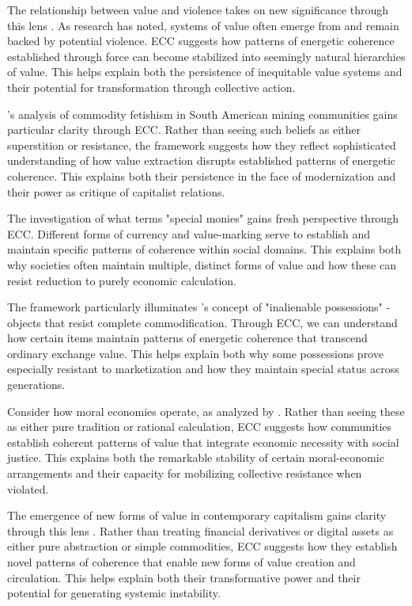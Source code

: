 \begin{refsection}
The relationship between value and violence takes on new significance through this lens \cite{graeber2001toward}. As research has noted, systems of value often emerge from and remain backed by potential violence. ECC suggests how patterns of energetic coherence established through force can become stabilized into seemingly natural hierarchies of value. This helps explain both the persistence of inequitable value systems and their potential for transformation through collective action.

\cite{taussig1980devil}'s analysis of commodity fetishism in South American mining communities gains particular clarity through ECC. Rather than seeing such beliefs as either superstition or resistance, the framework suggests how they reflect sophisticated understanding of how value extraction disrupts established patterns of energetic coherence. This explains both their persistence in the face of modernization and their power as critique of capitalist relations.

The investigation of what \cite{zelizer1994social} terms "special monies" gains fresh perspective through ECC. Different forms of currency and value-marking serve to establish and maintain specific patterns of coherence within social domains. This explains both why societies often maintain multiple, distinct forms of value and how these can resist reduction to purely economic calculation.

The framework particularly illuminates \cite{weiner1992inalienable}'s concept of "inalienable possessions" - objects that resist complete commodification. Through ECC, we can understand how certain items maintain patterns of energetic coherence that transcend ordinary exchange value. This helps explain both why some possessions prove especially resistant to marketization and how they maintain special status across generations.

Consider how moral economies operate, as analyzed by \cite{thompson1971moral}. Rather than seeing these as either pure tradition or rational calculation, ECC suggests how communities establish coherent patterns of value that integrate economic necessity with social justice. This explains both the remarkable stability of certain moral-economic arrangements and their capacity for mobilizing collective resistance when violated.

The emergence of new forms of value in contemporary capitalism gains clarity through this lens \cite{appadurai1986social}. Rather than treating financial derivatives or digital assets as either pure abstraction or simple commodities, ECC suggests how they establish novel patterns of coherence that enable new forms of value creation and circulation. This helps explain both their transformative power and their potential for generating systemic instability.


\end{refsection}
